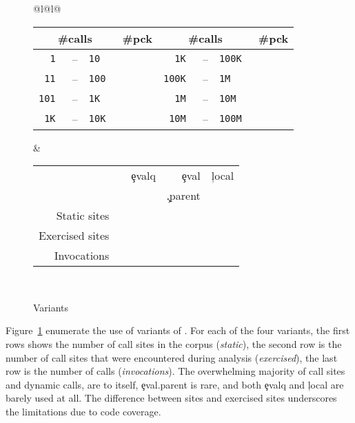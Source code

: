\documentclass[screen,acmsmall]{acmart}
\begin{document}
\begin{figure}[b]

\begin{tabular}{@{}l@{\hspace{1.5cm}}l@{}}
\begin{minipage} {5cm}
  \begin{tabular}{|r@{\,}r@{\,}l@{}r|r@{\,}r@{\,}l@{}r|} \hline
    \multicolumn{3}{|c}{\small\#calls} &\small \#pck
&     \multicolumn{3}{c}{\small\#calls} &\small\#pck \\\hline
\tt 1 &--& \tt 10      & \Bina  & \tt 1K &--&\tt 100K  & \Bine\\
\tt 11 &--& \tt 100    & \Binb  & \tt 100K &--&\tt 1M  & \Binf\\
\tt 101 &--& \tt 1K    & \Binc  & \tt 1M &--&\tt 10M   & \Bing\\
\tt 1K &--& \tt 10K    & \Bind  & \tt 10M &--& \tt 100M & \Binh\\\hline
\end{tabular}
\caption{Call frequency}\label{freq}
\end{minipage}
&
\begin{minipage}{7cm}
\begin{tabular}{|@{\,}r|rrrr|}\hline
  &\eval & \c{evalq} & \c{eval} & \c{local}\\[-2mm]
           & & & \c{.parent} &\\\hline
\small Static sites &\Staticeval&\Staticevalq&\Staticevalparent&\Staticlocal \\
\small Exercised sites&\Triggeredeval&\Triggeredevalq&\Triggeredevalparent&\Triggeredlocal\\
\small Invocations&\EvalsRnd&\EvalqsRnd&\EparentsRnd&\LocalsRnd\\\hline
\end{tabular}~\\[2mm]\caption{Variants}\label{tab:variantseval}
\end{minipage}\end{tabular}\end{figure}


Figure~\ref{tab:variantseval} enumerate the use of variants of \eval. For each
of the four variants, the first rows shows the number of call sites in the
corpus (\emph{static}), the second row is the number of call sites that were
encountered during analysis (\emph{exercised}), the last row is the number of
calls (\emph{invocations}). The overwhelming majority of call sites and dynamic
calls, are to \eval itself, \c{eval.parent} is rare, and both \c{evalq} and
\c{local} are barely used at all. The difference between sites and exercised
sites underscores the limitations due to code coverage.
\end{document}
